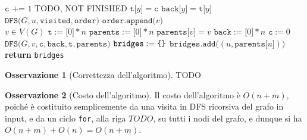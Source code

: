 \documentclass[14pt]{extreport}
\theoremstyle{definition}
\theoremstyle{definition}
\newtheorem{remark}{Osservazione}[subsection]
\begin{document}
\begin{algorithm}[H]
    \caption{
        Dato un grafo indiretto $G$, rappresentato attraverso liste di adiacenza, l'algoritmo restituisce i ponti di $G$.\\
        \textbf{Input}: $G$ grafo indiretto, rappresentato attraverso liste di adiacenza.\\
        \textbf{Output}: i ponti di $G$.
    }

    \begin{algorithmic}[1]
            \State $\texttt{c += }1$
            \State TODO, NOT FINISHED
            \State $\texttt{t[}y\texttt{]}= \texttt{c}$
            \State $\texttt{back[}y\texttt{]}= \texttt{t[}y\texttt{]}$
                    \State $\texttt{DFS(}G, u, \texttt{visited},\texttt{order)}$
                \EndIf
            \EndFor
            \State $\texttt{order.append(}v\texttt{)}$ 
        \EndFunction
        \\
            \State $v \in V(G)$ 
            \State $\texttt{t} := \texttt{[}0\texttt{]} * n$
            \State $\texttt{parents} := \texttt{[}0\texttt{]} * n$
            \State $\texttt{parents[}v\texttt{]}=v$
            \State $\texttt{back} := \texttt{[}0\texttt{]} * n$
            \State $\texttt{c} := 0$
            \State $\texttt{DFS(}G, v, \texttt{c}, \texttt{back}, \texttt{t}, \texttt{parents)}$
            \State $\texttt{bridges} := \verb|{|\verb|}|$
                    \State $\texttt{bridges.add(}(u, \texttt{parents[}u\texttt{]})\texttt{)}$
                \EndIf
            \EndFor
            \State \textbf{return} \texttt{bridges}
        \EndFunction
    \end{algorithmic}
\end{algorithm}

\begin{remark}[Correttezza dell'algoritmo]
    TODO
\end{remark}

\begin{remark}[Costo dell'algoritmo]
    Il costo dell'algoritmo è $O(n + m)$, poiché è costituito semplicemente da una visita in DFS ricorsiva del grafo in input, e da un ciclo \texttt{for}, alla riga $TODO$, su tutti i nodi del grafo, e dunque si ha $O(n + m) + O(n) = O(n + m)$.
\end{remark}
\end{document}
